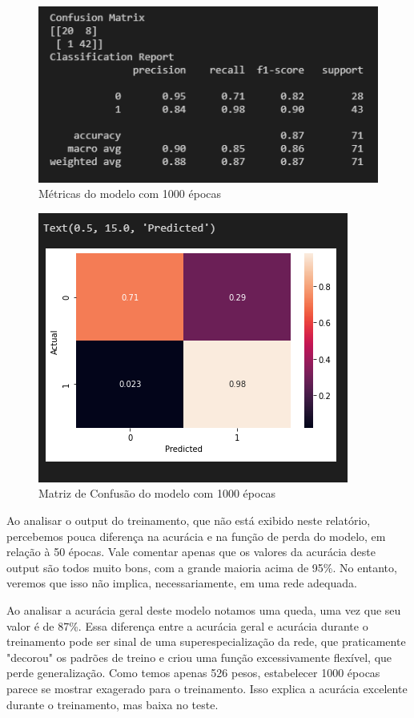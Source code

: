\documentclass[12pt]{article}
\begin{document}
\begin{figure}[H]
	\centering
	\includegraphics[width=0.7\linewidth]{Imagens/1000epocas/metricas1000epocas}
	\caption{Métricas do modelo com 1000 épocas}
	\label{fig:metricas1000epocas}
\end{figure}
\begin{figure}[H]
	\centering
	\includegraphics[width=0.7\linewidth]{Imagens/1000epocas/confusao1000epocas}
	\caption{Matriz de Confusão do modelo com 1000 épocas}
	\label{fig:confusao1000epocas}
\end{figure}

Ao analisar o output do treinamento, que não está exibido neste relatório, percebemos pouca diferença na acurácia e na função de perda do modelo, em relação à 50 épocas. Vale comentar apenas que os valores da acurácia deste output são todos muito bons, com a grande maioria acima de 95\%. No entanto, veremos que isso não implica, necessariamente, em uma rede adequada.

Ao analisar a acurácia geral deste modelo notamos uma queda, uma vez que seu valor é de 87\%. Essa diferença entre a acurácia geral e acurácia durante o treinamento pode ser sinal de uma superespecialização da rede, que praticamente "decorou" os padrões de treino e criou uma função excessivamente flexível, que perde generalização. Como temos apenas 526 pesos, estabelecer 1000 épocas parece se mostrar exagerado para o treinamento. Isso explica a acurácia excelente durante o treinamento, mas baixa no teste. 
\end{document}
